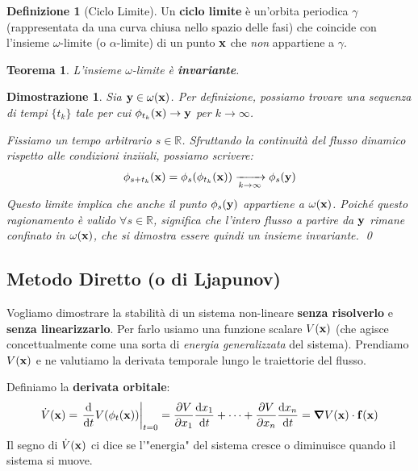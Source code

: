 \documentclass[openany]{book}
\newtheorem*{teorema}{Teorema}
\newtheorem*{dimostrazione}{Dimostrazione}
\theoremstyle{definition}
\newtheorem*{definizione}{Definizione}
\theoremstyle{remark}
\newcommand{\R}{\mathbb{R}}
\begin{document}
\begin{definizione}[Ciclo Limite]
Un \textbf{ciclo limite} è un'orbita periodica $\gamma$ (rappresentata da una curva chiusa nello spazio delle fasi) che coincide con l'insieme $\omega$-limite (o $\alpha$-limite) di un punto $\vb{x}$ che \textit{non} appartiene a $\gamma$.
\end{definizione}

\begin{teorema}
L'insieme $\omega$-limite è \textbf{invariante}.
\end{teorema}
\begin{dimostrazione}
Sia $\vb{y} \in \omega(\vb{x})$. Per definizione, possiamo trovare una sequenza di tempi $\{t_k\}$ tale per cui $\phi_{t_k}(\vb{x}) \to \vb{y}$ per $k \to \infty$.

Fissiamo un tempo arbitrario $s \in \R$. Sfruttando la continuità del flusso dinamico rispetto alle condizioni inziiali, possiamo scrivere:
$$ \phi_{s+t_k}(\vb{x}) = \phi_s(\phi_{t_k}(\vb{x})) \xrightarrow[k \to \infty]{} \phi_s(\vb{y}) $$
Questo limite implica che anche il punto $\phi_s(\vb{y})$ appartiene a $\omega(\vb{x})$. 
Poiché questo ragionamento è valido $\forall s \in \R$, significa che l'intero flusso a partire da $\vb{y}$ rimane confinato in $\omega(\vb{x})$, che si dimostra essere quindi un insieme invariante. \qed
\end{dimostrazione}

\subsection{Metodo Diretto (o di Ljapunov)}

Vogliamo dimostrare la stabilità di un sistema non-lineare \textbf{senza risolverlo} e \textbf{senza linearizzarlo}. 
Per farlo usiamo una funzione scalare $V(\vb{x})$ (che agisce concettualmente come una sorta di \textit{energia generalizzata} del sistema). 
Prendiamo $V(\vb{x})$ e ne valutiamo la derivata temporale lungo le traiettorie del flusso.

Definiamo la \textbf{derivata orbitale}:
\begin{equation}
    \dot{V}(\vb{x}) = \eval{\dv{t} V(\phi_t(\vb{x}))}_{t=0} = \pdv{V}{x_1}\dv{x_1}{t} + \dots + \pdv{V}{x_n}\dv{x_n}{t} = \grad V(\vb{x}) \cdot \vb{f}(\vb{x})
\end{equation}
Il segno di $\dot{V}(\vb{x})$ ci dice se l'"energia" del sistema cresce o diminuisce quando il sistema si muove.
\end{document}
